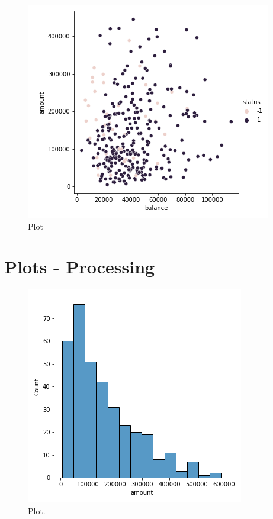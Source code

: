 \documentclass[a4paper,12pt]{report}
\begin{document}
		\begin{figure}[H]
		\begin{center}
		\includegraphics[scale=0.40]{balance_ammount_scatterPlot}	
		\end{center}
		\caption{Plot}
		\label{fig:balance_ammount_scatterPlot}
		\end{figure}


	\section{Plots - Processing}

		\begin{figure}[H]
		\begin{center}
		\includegraphics[scale=0.40]{amount_barChart}	
		\end{center}
		\caption{Plot.}
		\label{fig:amount_barChart}
		\end{figure}
\end{document}
